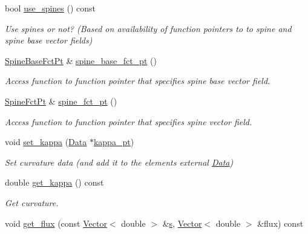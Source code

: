 \begin{DoxyCompactItemize}
bool \hyperlink{classoomph_1_1YoungLaplaceEquations_aaf07cfa70e0de1b388290d2e1f63a7b7}{use\+\_\+spines} () const
\begin{DoxyCompactList}\small\item\em Use spines or not? (Based on availability of function pointers to to spine and spine base vector fields) \end{DoxyCompactList}\item 
\hyperlink{classoomph_1_1YoungLaplaceEquations_a5e09288f5d3b710f23e8e57401a48ccc}{Spine\+Base\+Fct\+Pt} \& \hyperlink{classoomph_1_1YoungLaplaceEquations_a123ecf6aeb497b78e6db88995aa22472}{spine\+\_\+base\+\_\+fct\+\_\+pt} ()
\begin{DoxyCompactList}\small\item\em Access function to function pointer that specifies spine base vector field. \end{DoxyCompactList}\item 
\hyperlink{classoomph_1_1YoungLaplaceEquations_a97448cfb2f6361e986d363d9e4463f9f}{Spine\+Fct\+Pt} \& \hyperlink{classoomph_1_1YoungLaplaceEquations_a8dbe47fba62678dba689f1f0202d9c96}{spine\+\_\+fct\+\_\+pt} ()
\begin{DoxyCompactList}\small\item\em Access function to function pointer that specifies spine vector field. \end{DoxyCompactList}\item 
void \hyperlink{classoomph_1_1YoungLaplaceEquations_a2f1e916b64e50292e47827ea7ba41db5}{set\+\_\+kappa} (\hyperlink{classoomph_1_1Data}{Data} $\ast$\hyperlink{classoomph_1_1YoungLaplaceEquations_af77f2f14be61aa0bd4f28c5df4fc712a}{kappa\+\_\+pt})
\begin{DoxyCompactList}\small\item\em Set curvature data (and add it to the element\textquotesingle{}s external \hyperlink{classoomph_1_1Data}{Data}) \end{DoxyCompactList}\item 
double \hyperlink{classoomph_1_1YoungLaplaceEquations_aa4144104f99e731a0e40ad4ced7f5e8e}{get\+\_\+kappa} () const
\begin{DoxyCompactList}\small\item\em Get curvature. \end{DoxyCompactList}\item 
void \hyperlink{classoomph_1_1YoungLaplaceEquations_ae0cc35d476be29d1c6395f227bb323e4}{get\+\_\+flux} (const \hyperlink{classoomph_1_1Vector}{Vector}$<$ double $>$ \&\hyperlink{cfortran_8h_ab7123126e4885ef647dd9c6e3807a21c}{s}, \hyperlink{classoomph_1_1Vector}{Vector}$<$ double $>$ \&flux) const

\end{DoxyCompactItemize}
